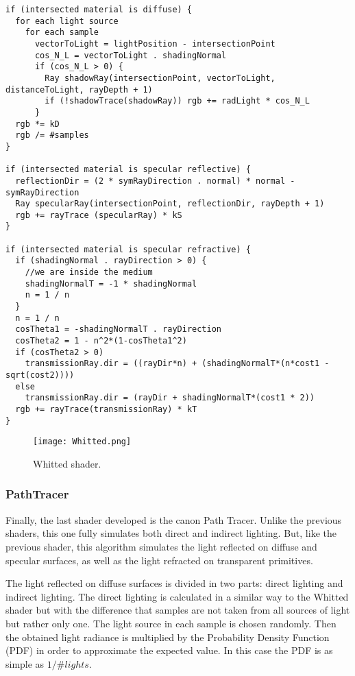 \begin{lstlisting}
if (intersected material is diffuse) {
  for each light source
    for each sample
      vectorToLight = lightPosition - intersectionPoint
      cos_N_L = vectorToLight . shadingNormal
      if (cos_N_L > 0) {
        Ray shadowRay(intersectionPoint, vectorToLight, distanceToLight, rayDepth + 1)
        if (!shadowTrace(shadowRay)) rgb += radLight * cos_N_L
      }
  rgb *= kD
  rgb /= #samples
}

if (intersected material is specular reflective) {
  reflectionDir = (2 * symRayDirection . normal) * normal - symRayDirection
  Ray specularRay(intersectionPoint, reflectionDir, rayDepth + 1)
  rgb += rayTrace (specularRay) * kS
}

if (intersected material is specular refractive) {
  if (shadingNormal . rayDirection > 0) {
    //we are inside the medium
    shadingNormalT = -1 * shadingNormal
    n = 1 / n
  }
  n = 1 / n
  cosTheta1 = -shadingNormalT . rayDirection
  cosTheta2 = 1 - n^2*(1-cosTheta1^2)
  if (cosTheta2 > 0)
    transmissionRay.dir = ((rayDir*n) + (shadingNormalT*(n*cost1 - sqrt(cost2))))
  else
    transmissionRay.dir = (rayDir + shadingNormalT*(cost1 * 2))
  rgb += rayTrace(transmissionRay) * kT
}
\end{lstlisting}

\begin{figure}[H]
	\centering
	\caption{Whitted shader.}
	\label{Whitted shader.}
	\texttt{[image: Whitted.png]}
\end{figure}


\subsubsection{PathTracer}

\par
Finally, the last shader developed is the canon Path Tracer.
Unlike the previous shaders, this one fully simulates both direct and indirect lighting.
But, like the previous shader, this algorithm simulates the light reflected on diffuse and specular surfaces, as well as the light refracted on transparent primitives.

\par
The light reflected on diffuse surfaces is divided in two parts: direct lighting and indirect lighting.
The direct lighting is calculated in a similar way to the Whitted shader but with the difference that samples are not taken from all sources of light but rather only one.
The light source in each sample is chosen randomly.
Then the obtained light radiance is multiplied by the Probability Density Function (PDF) in order to approximate the expected value.
In this case the PDF is as simple as
$1 / \#lights$.

